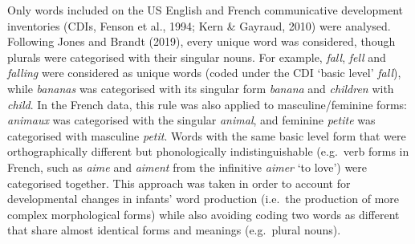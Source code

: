 \documentclass[
  man]{apa6}
\begin{document}
Only words included on the US English and French communicative development inventories (CDIs, Fenson et al., 1994; Kern \& Gayraud, 2010) were analysed. Following Jones and Brandt (2019), every unique word was considered, though plurals were categorised with their singular nouns. For example, \emph{fall}, \emph{fell} and \emph{falling} were considered as unique words (coded under the CDI `basic level' \emph{fall}), while \emph{bananas} was categorised with its singular form \emph{banana} and \emph{children} with \emph{child}. In the French data, this rule was also applied to masculine/feminine forms: \emph{animaux} was categorised with the singular \emph{animal}, and feminine \emph{petite} was categorised with masculine \emph{petit}. Words with the same basic level form that were orthographically different but phonologically indistinguishable (e.g.~verb forms in French, such as \emph{aime} and \emph{aiment} from the infinitive \emph{aimer} `to love') were categorised together. This approach was taken in order to account for developmental changes in infants' word production (i.e.~the production of more complex morphological forms) while also avoiding coding two words as different that share almost identical forms and meanings (e.g.~plural nouns).
\end{document}

